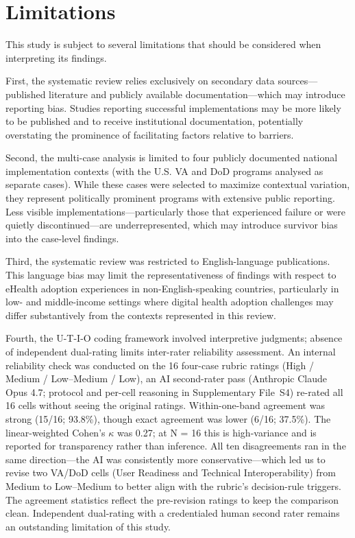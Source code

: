 \section{Limitations}

This study is subject to several limitations that should be considered when interpreting its findings.

First, the systematic review relies exclusively on secondary data sources—published literature and publicly available documentation—which may introduce reporting bias. Studies reporting successful implementations may be more likely to be published and to receive institutional documentation, potentially overstating the prominence of facilitating factors relative to barriers.

Second, the multi-case analysis is limited to four publicly documented national implementation contexts (with the U.S. VA and DoD programs analysed as separate cases). While these cases were selected to maximize contextual variation, they represent politically prominent programs with extensive public reporting. Less visible implementations—particularly those that experienced failure or were quietly discontinued—are underrepresented, which may introduce survivor bias into the case-level findings.

Third, the systematic review was restricted to English-language publications. This language bias may limit the representativeness of findings with respect to eHealth adoption experiences in non-English-speaking countries, particularly in low- and middle-income settings where digital health adoption challenges may differ substantively from the contexts represented in this review.

Fourth, the U-T-I-O coding framework involved interpretive judgments; absence of independent dual-rating limits inter-rater reliability assessment. An internal reliability check was conducted on the 16 four-case rubric ratings (High / Medium / Low--Medium / Low), an AI second-rater pass (Anthropic Claude Opus 4.7; protocol and per-cell reasoning in Supplementary File~S4) re-rated all 16 cells without seeing the original ratings. Within-one-band agreement was strong (15/16; 93.8\%), though exact agreement was lower (6/16; 37.5\%). The linear-weighted Cohen's $\kappa$ was 0.27; at N = 16 this is high-variance and is reported for transparency rather than inference. All ten disagreements ran in the same direction—the AI was consistently more conservative—which led us to revise two VA/DoD cells (User Readiness and Technical Interoperability) from Medium to Low--Medium to better align with the rubric's decision-rule triggers. The agreement statistics reflect the pre-revision ratings to keep the comparison clean. Independent dual-rating with a credentialed human second rater remains an outstanding limitation of this study.

